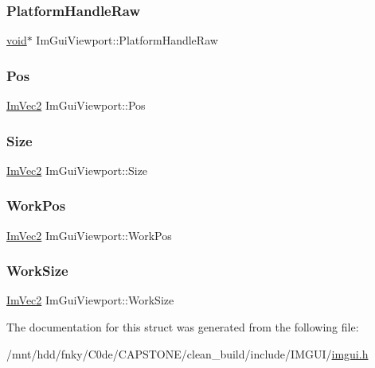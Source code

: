 \subsubsection{\texorpdfstring{Platform\+Handle\+Raw}{PlatformHandleRaw}}
{\footnotesize\ttfamily \hyperlink{imgui__impl__opengl3__loader_8h_ac668e7cffd9e2e9cfee428b9b2f34fa7}{void}$\ast$ Im\+Gui\+Viewport\+::\+Platform\+Handle\+Raw}

\mbox{\label{structImGuiViewport_a271ff4e595757a809f237616dd07d525}} 
\subsubsection{\texorpdfstring{Pos}{Pos}}
{\footnotesize\ttfamily \hyperlink{structImVec2}{Im\+Vec2} Im\+Gui\+Viewport\+::\+Pos}

\mbox{\label{structImGuiViewport_ab44a78f37dd56cc7581f715485485787}} 
\subsubsection{\texorpdfstring{Size}{Size}}
{\footnotesize\ttfamily \hyperlink{structImVec2}{Im\+Vec2} Im\+Gui\+Viewport\+::\+Size}

\mbox{\label{structImGuiViewport_a9171354583726d867938e93023334d6b}} 
\subsubsection{\texorpdfstring{Work\+Pos}{WorkPos}}
{\footnotesize\ttfamily \hyperlink{structImVec2}{Im\+Vec2} Im\+Gui\+Viewport\+::\+Work\+Pos}

\mbox{\label{structImGuiViewport_ac4c1ce7d912b72b42a14f00c8cefd8d0}} 
\subsubsection{\texorpdfstring{Work\+Size}{WorkSize}}
{\footnotesize\ttfamily \hyperlink{structImVec2}{Im\+Vec2} Im\+Gui\+Viewport\+::\+Work\+Size}



The documentation for this struct was generated from the following file\+:\begin{DoxyCompactItemize}
\item 
/mnt/hdd/fnky/\+C0de/\+C\+A\+P\+S\+T\+O\+N\+E/clean\+\_\+build/include/\+I\+M\+G\+U\+I/\hyperlink{imgui_8h}{imgui.\+h}\end{DoxyCompactItemize}
